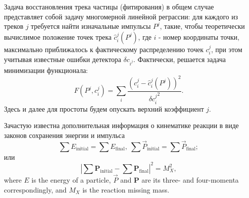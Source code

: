 %
%

Задача восстановления трека частицы (фитирования) в общем случае представляет собой задачу многомерной линейной реграссии: для каждого из треков $j$ требуется найти изначальные импульсы $P^j$, такие, чтобы теоретически вычислимое положение точек трека $\hat{c}_i^j(P^j)$, где $i$ - номер координаты точки, максимально приближалось к фактическому распределению точек $c_i^j$, при этом учитывая известные ошибки детектора $\delta c_{i^j}$. Фактически, решается задача минимизации функционала:
\begin{equation}
\label{track_fit}
F(P^j, c_i^j) = \sum_i \frac{(c_i^j - \hat{c}_i^j(P^j))^2}{{\delta c_i^j}^2}.
\end{equation}
Здесь и далее для простоты будем опускать верхний коэффициент $j$.

Зачастую известна дополнительная информация о кинематике реакции в виде законов сохранения энергии и импульса
\begin{equation}
\label{cons_full}
\sum E_\mathrm{initial} = \sum E_\mathrm{final},~\sum\vec{P}_\mathrm{initial} = \sum\vec{P}_\mathrm{final};
\end{equation}
или
\begin{equation}
\label{cons_miss}
\displaystyle\left|\sum\boldsymbol{P}_\mathrm{initial} - \sum\boldsymbol{P}_\mathrm{final}\right|^2 = M_X^2,
\end{equation}
where $E$ is the energy of a particle, $\vec{P}$ and $\boldsymbol{P}$ are its three- and four-momenta correspondingly, and $M_X$ is the reaction missing mass.

